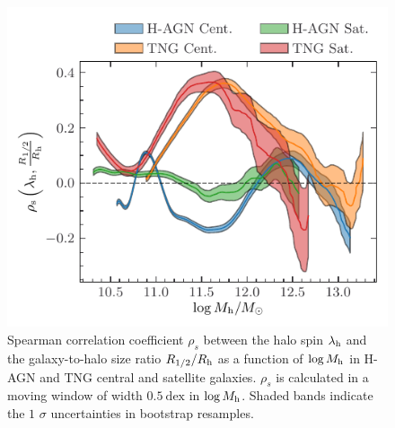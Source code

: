 \documentclass[useAMS,usenatbib]{mnras}
\begin{document}
\begin{figure}
    \centering
    \includegraphics[width=\columnwidth]{Figures/spin_size_spearmans.pdf}
    \caption{Spearman correlation coefficient $\rho_s$ between the halo spin $\lambda_{\rm h}$ and the galaxy-to-halo size ratio $R_{1/2}/R_{\rm h}$ as a function of $\log M_{\rm h}$ in H-AGN and TNG central and satellite galaxies. $\rho_s$ is calculated in a moving window of width $0.5~\mathrm{dex}$ in $\log M_{\rm h}$. Shaded bands indicate the $1$ $\sigma$ uncertainties in bootstrap resamples.}
    \label{fig:mvir_spearms}
\end{figure}
\end{document}
